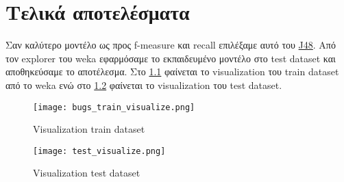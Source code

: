 \chapter{Τελικά αποτελέσματα}

Σαν καλύτερο μοντέλο ως προς f-measure και recall επιλέξαμε αυτό του \hyperref[sssec:j48]{J48}.
Από τον explorer του weka εφαρμόσαμε το εκπαιδευμένο μοντέλο στο test dataset και αποθηκεύσαμε το αποτέλεσμα.
Στο \hyperref[fig:train-set-visualize]{\figurename{} \ref{fig:train-set-visualize}}
φαίνεται το visualization του train dataset από το weka 
ενώ στο \hyperref[fig:test-set-visualize]{\figurename{} \ref{fig:test-set-visualize}}
φαίνεται το visualization του test dataset.

\begin{figure}[htb]
\centering
\texttt{[image: bugs\_train\_visualize.png]}
\caption{Visualization train dataset}
\label{fig:train-set-visualize}
\end{figure}
\begin{figure}[htb]
\centering
\texttt{[image: test\_visualize.png]}
\caption{Visualization test dataset}
\label{fig:test-set-visualize}
\end{figure}